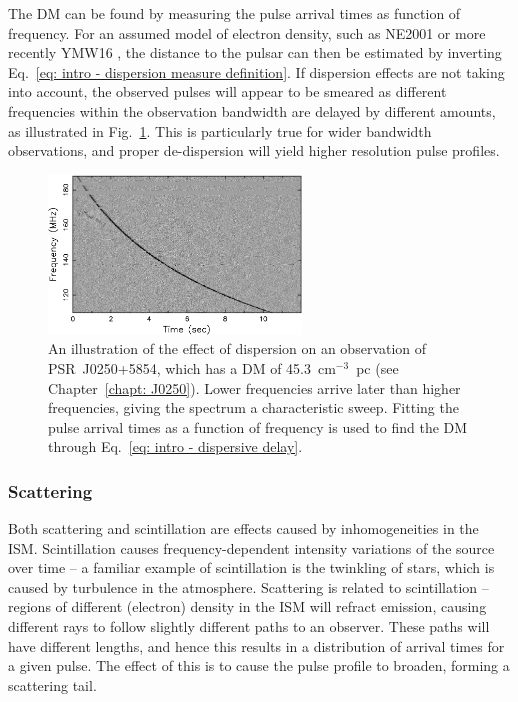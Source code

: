 The DM can be found by measuring the pulse arrival times as function of frequency. For an assumed model of electron density, such as NE2001 \citep{CLxx2002} or more recently YMW16 \citep{YMWx2016}, the distance to the pulsar can then be estimated by inverting Eq.~\eqref{eq: intro - dispersion measure definition}. If dispersion effects are not taking into account, the observed pulses will appear to be smeared as different frequencies within the observation bandwidth are delayed by different amounts, as illustrated in Fig.~\ref{fig: intro - DM illustration}. This is particularly true for wider bandwidth observations, and proper de-dispersion will yield higher resolution pulse profiles.
\begin{figure}
	\centering
	\includegraphics[width=0.6\textwidth]{Figures/Introduction/dispersed_data_2}
    \caption[The effect of dispersion on a pulse profile]{An illustration of the effect of dispersion on an observation of PSR~J0250+5854, which has a DM of 45.3~cm$^{-3}$~pc (see Chapter~\ref{chapt: J0250}). Lower frequencies arrive later than higher frequencies, giving the spectrum a characteristic sweep. Fitting the pulse arrival times as a function of frequency is used to find the DM through Eq.~\eqref{eq: intro - dispersive delay}.}
    \label{fig: intro - DM illustration} 
\end{figure}




\subsubsection{Scattering}
\label{sec: intro - observation processing - ISM effects - scattering}

Both scattering and scintillation are effects caused by inhomogeneities in the ISM. Scintillation causes frequency-dependent intensity variations of the source over time -- a familiar example of scintillation is the twinkling of stars, which is caused by turbulence in the atmosphere. Scattering is related to scintillation -- regions of different (electron) density in the ISM will refract emission, causing different rays to follow slightly different paths to an observer. These paths will have different lengths, and hence this results in a distribution of arrival times for a given pulse. The effect of this is to cause the pulse profile to broaden, forming a scattering tail.

